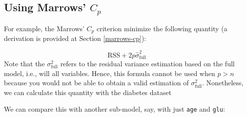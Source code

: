 \documentclass[
]{book}
\newenvironment{Shaded}{\begin{snugshade}}{\end{snugshade}}
\newcommand{\AttributeTok}[1]{\textcolor[rgb]{0.13,0.29,0.53}{#1}}
\newcommand{\CommentTok}[1]{\textcolor[rgb]{0.56,0.35,0.01}{\textit{#1}}}
\newcommand{\DecValTok}[1]{\textcolor[rgb]{0.00,0.00,0.81}{#1}}
\newcommand{\DocumentationTok}[1]{\textcolor[rgb]{0.56,0.35,0.01}{\textbf{\textit{#1}}}}
\newcommand{\FunctionTok}[1]{\textcolor[rgb]{0.13,0.29,0.53}{\textbf{#1}}}
\newcommand{\NormalTok}[1]{#1}
\newcommand{\OtherTok}[1]{\textcolor[rgb]{0.56,0.35,0.01}{#1}}
\newcommand{\SpecialCharTok}[1]{\textcolor[rgb]{0.81,0.36,0.00}{\textbf{#1}}}
\theoremstyle{definition}
\theoremstyle{definition}
\theoremstyle{definition}
\theoremstyle{definition}
\theoremstyle{remark}
\begin{document}
\hypertarget{using-marrows-c_p}{%
\subsection{\texorpdfstring{Using Marrows' \(C_p\)}{Using Marrows' C\_p}}\label{using-marrows-c_p}}

For example, the Marrows' \(C_p\) criterion minimize the following quantity (a derivation is provided at Section \ref{marrows-cp}):

\[\text{RSS} + 2 p \widehat\sigma_{\text{full}}^2\]
Note that the \(\sigma_{\text{full}}^2\) refers to the residual variance estimation based on the full model, i.e., will all variables. Hence, this formula cannot be used when \(p > n\) because you would not be able to obtain a valid estimation of \(\sigma_{\text{full}}^2\). Nonetheless, we can calculate this quantity with the diabetes dataset

\begin{Shaded}
\end{Shaded}

We can compare this with another sub-model, say, with just \texttt{age} and \texttt{glu}:

\begin{Shaded}
\end{Shaded}
\end{document}
